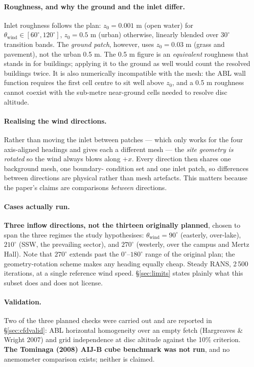 \documentclass[11pt,letterpaper]{article}
\begin{document}
\paragraph{Roughness, and why the ground and the inlet differ.} Inlet
roughness follows the plan: $z_0 = 0.001$ m (open water) for
$\theta_{\text{wind}} \in [60^\circ, 120^\circ]$, $z_0 = 0.5$ m (urban)
otherwise, linearly blended over $30^\circ$ transition bands. The
\emph{ground patch}, however, uses $z_0 = 0.03$ m (grass and pavement), not the
urban 0.5 m. The 0.5 m figure is an \emph{equivalent} roughness that stands in
for buildings; applying it to the ground as well would count the resolved
buildings twice. It is also numerically incompatible with the mesh: the ABL
wall function requires the first cell centre to sit well above $z_0$, and a
0.5 m roughness cannot coexist with the sub-metre near-ground cells needed to
resolve disc altitude.

\paragraph{Realising the wind directions.} Rather than moving the inlet between
patches --- which only works for the four axis-aligned headings and gives each a
different mesh --- the \emph{site geometry is rotated} so the wind always blows
along $+x$. Every direction then shares one background mesh, one boundary-
condition set and one inlet patch, so differences between directions are
physical rather than mesh artefacts. This matters because the paper's claims
are comparisons \emph{between} directions.

\paragraph{Cases actually run.} \textbf{Three inflow directions, not the
thirteen originally planned}, chosen to span the three regimes the study
hypothesises: $\theta_{\text{wind}} = 90^\circ$ (easterly, over-lake),
$210^\circ$ (SSW, the prevailing sector), and $270^\circ$ (westerly, over the
campus and Mertz Hall). Note that $270^\circ$ extends past the
$0^\circ$--$180^\circ$ range of the original plan; the geometry-rotation scheme
makes any heading equally cheap. Steady RANS, 2\,500 iterations, at a single
reference wind speed. \S\ref{sec:limits} states plainly what this subset does
and does not license.

\paragraph{Validation.} Two of the three planned checks were carried out and
are reported in \S\ref{sec:cfdvalid}: ABL horizontal homogeneity over an empty
fetch (Hargreaves \& Wright 2007) and grid independence at disc altitude
against the 10\% criterion. \textbf{The Tominaga (2008) AIJ-B cube benchmark
was not run}, and no anemometer comparison exists; neither is claimed.
\end{document}
